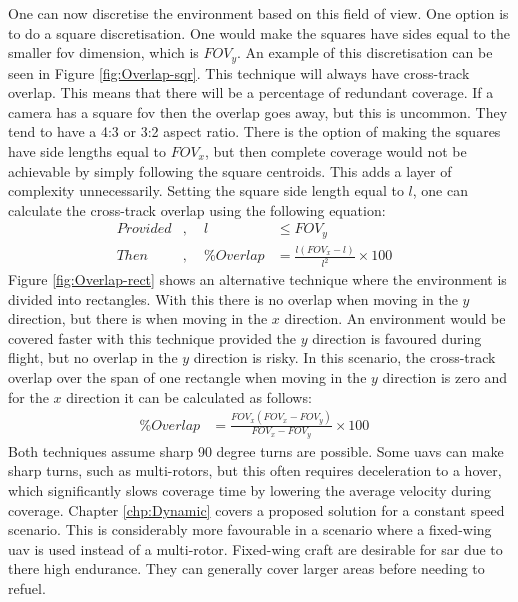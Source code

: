 One can now discretise the environment based on this field of view. One option is to do a square discretisation. One would make the squares have sides equal to the smaller \acs{fov} dimension, which is $FOV_y$. An example of this discretisation can be seen in Figure \ref{fig:Overlap-sqr}. This technique will always have cross-track overlap. This means that there will be a percentage of redundant coverage. If a camera has a square \acs{fov} then the overlap goes away, but this is uncommon. They tend to have a 4:3 or 3:2 aspect ratio. There is the option of making the squares have side lengths equal to $FOV_x$, but then complete coverage would not be achievable by simply following the square centroids. This adds a layer of complexity unnecessarily. Setting the square side length equal to $l$, one can calculate the cross-track overlap using the following equation:
\begin{equation}
	\label{eqn:overlap_sqr}
	\begin{aligned}
		Provided&,& ~~l &\leq FOV_y& \\
		Then&,& ~~\%Overlap &= \frac{l(FOV_x - l)}{l^2} \times 100&
	\end{aligned}
\end{equation}
Figure \ref{fig:Overlap-rect} shows an alternative technique where the environment is divided into rectangles. With this there is no overlap when moving in the $y$ direction, but there is when moving in the $x$ direction. An environment would be covered faster with this technique provided the $y$ direction is favoured during flight, but no overlap in the $y$ direction is risky. In this scenario, the cross-track overlap over the span of one rectangle when moving in the $y$ direction is zero and for the $x$ direction it can be calculated as follows:
\begin{equation}
	\label{eqn:overlap_rect}
	\begin{aligned}
		\%Overlap &= \frac{FOV_x(FOV_x-FOV_y)}{FOV_x-FOV_y} \times 100&
	\end{aligned}
\end{equation}
Both techniques assume sharp 90 degree turns are possible. Some \acsp{uav} can make sharp turns, such as multi-rotors, but this often requires deceleration to a hover, which significantly slows coverage time by lowering the average velocity during coverage. Chapter \ref{chp:Dynamic} covers a proposed solution for a constant speed scenario. This is considerably more favourable in a scenario where a fixed-wing \acs{uav} is used instead of a multi-rotor. Fixed-wing craft are desirable for \acs{sar} due to there high endurance. They can generally cover larger areas before needing to refuel.\\
